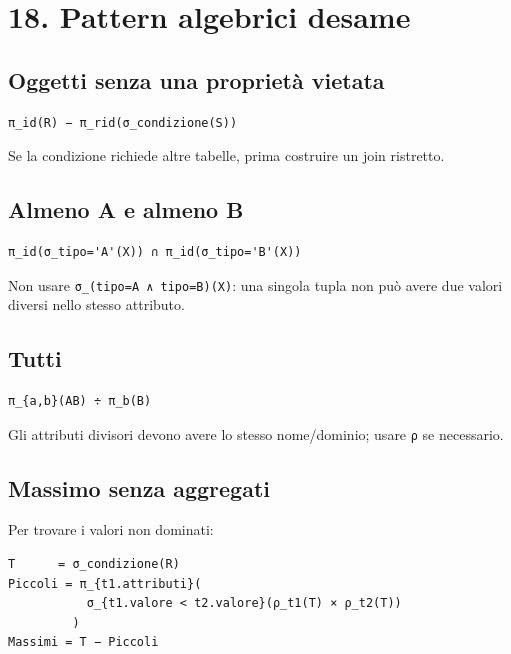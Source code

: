 \documentclass[
  10pt,
  a4paper,
]{article}
\begin{document}
\section{18. Pattern algebrici
d\textquotesingle esame}\label{18-pattern-algebrici-desame}

\subsection{Oggetti senza una proprietà
vietata}\label{oggetti-senza-una-proprietuxe0-vietata}

\begin{verbatim}
π_id(R) − π_rid(σ_condizione(S))
\end{verbatim}

Se la condizione richiede altre tabelle, prima costruire un join
ristretto.

\subsection{Almeno A e almeno B}\label{almeno-a-e-almeno-b}

\begin{verbatim}
π_id(σ_tipo='A'(X)) ∩ π_id(σ_tipo='B'(X))
\end{verbatim}

Non usare
\texttt{σ\_(tipo=\textquotesingle{}A\textquotesingle{}\ ∧\ tipo=\textquotesingle{}B\textquotesingle{})(X)}:
una singola tupla non può avere due valori diversi nello stesso
attributo.

\subsection{Tutti}\label{tutti}

\begin{verbatim}
π_{a,b}(AB) ÷ π_b(B)
\end{verbatim}

Gli attributi divisori devono avere lo stesso nome/dominio; usare
\texttt{ρ} se necessario.

\subsection{Massimo senza aggregati}\label{massimo-senza-aggregati}

Per trovare i valori non dominati:

\begin{verbatim}
T      = σ_condizione(R)
Piccoli = π_{t1.attributi}(
           σ_{t1.valore < t2.valore}(ρ_t1(T) × ρ_t2(T))
         )
Massimi = T − Piccoli
\end{verbatim}
\end{document}
